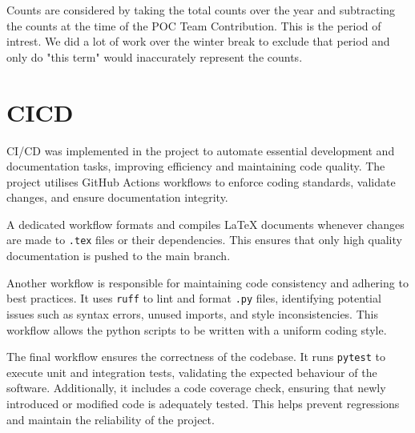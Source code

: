 \documentclass{article}
\begin{document}
Counts are considered by taking the total counts over the year and
subtracting the counts at the time of the POC Team Contribution. This
is the period of intrest.
We did a lot of work over the winter break to exclude that period and
only do "this term" would inaccurately represent the counts.
\section{CICD}


CI/CD was implemented in the project to automate essential
development and documentation tasks, improving efficiency and
maintaining code quality. The project utilises GitHub Actions
workflows to enforce coding standards, validate changes, and ensure
documentation integrity.

A dedicated workflow formats and compiles \LaTeX{} documents whenever
changes are made to \texttt{.tex} files or their dependencies. This ensures that
only high quality documentation is pushed to the main branch.

Another workflow is responsible for maintaining code consistency and
adhering to best practices. It uses \texttt{ruff} to lint and format
\texttt{.py} files, identifying potential issues such as syntax
errors, unused imports, and style inconsistencies. This workflow
allows the python scripts to be written with a uniform coding style.

The final workflow ensures the correctness of the codebase. It runs
\texttt{pytest} to execute unit and integration tests, validating the
expected behaviour of the software. Additionally, it includes a code
coverage check, ensuring that newly introduced or modified code is
adequately tested. This helps prevent regressions and maintain the
reliability of the project.
\end{document}
